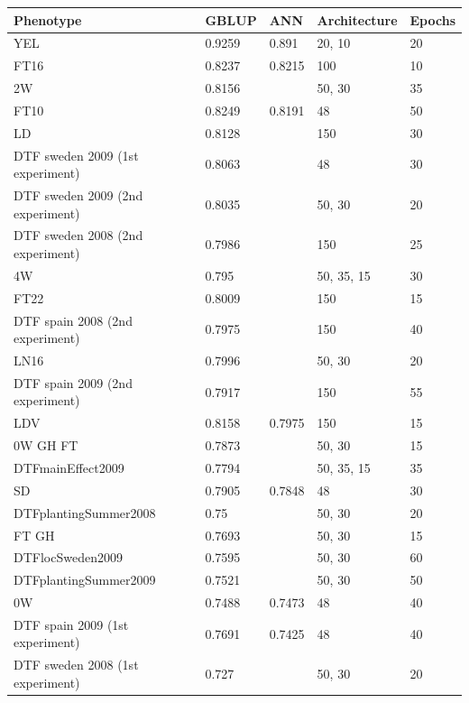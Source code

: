 \begin{longtable}{p{} p{} p{} p{} p{}}
  \hline
  Phenotype & GBLUP & ANN & Architecture & Epochs \\
  \hline
  YEL  & 0.9259 & 0.891 & 20, 10 & 20 \\
  FT16 & 0.8237 & 0.8215 & 100 & 10 \\
  2W & 0.8156 & \color{red}{0.8205} & 50, 30 & 35 \\
  FT10 & 0.8249 & 0.8191 & 48 & 50 \\
  LD & 0.8128 & \color{red}{0.8159} & 150 & 30 \\
  DTF sweden 2009 (1st experiment) & 0.8063 & \color{red}{0.8141} & 48 & 30 \\
  DTF sweden 2009 (2nd experiment) & 0.8035 & \color{red}{0.8091} & 50, 30 & 20 \\
  DTF sweden 2008 (2nd experiment) & 0.7986 & \color{red}{0.8057} & 150 & 25 \\
  4W & 0.795 & \color{red}{0.8052} & 50, 35, 15 & 30 \\
  FT22 & 0.8009 & \color{red}{0.8043} & 150 & 15 \\
  DTF spain 2008 (2nd experiment) & 0.7975 & \color{red}{0.8032} & 150 & 40 \\
  LN16 & 0.7996 & \color{red}{0.7999} & 50, 30 & 20 \\
  DTF spain 2009 (2nd experiment) & 0.7917 & \color{red}{0.7988} & 150 & 55 \\
  LDV & 0.8158 & 0.7975 & 150 & 15 \\
  0W GH FT & 0.7873 & \color{red}{0.7942} & 50, 30 & 15 \\
  DTFmainEffect2009 & 0.7794 & \color{red}{0.7855} & 50, 35, 15 & 35 \\
  SD & 0.7905 & 0.7848 & 48 & 30 \\
  DTFplantingSummer2008 & 0.75 & \color{red}{0.7746} & 50, 30 & 20 \\
  FT GH & 0.7693 & \color{red}{0.7702} & 50, 30 & 15 \\
  DTFlocSweden2009 & 0.7595 & \color{red}{0.7626} & 50, 30 & 60 \\
  DTFplantingSummer2009 & 0.7521 & \color{red}{0.7584} & 50, 30 & 50 \\
  0W & 0.7488 & 0.7473 & 48 & 40 \\
  DTF spain 2009 (1st experiment) & 0.7691 & 0.7425 & 48 & 40 \\
  DTF sweden 2008 (1st experiment) & 0.727 & \color{red}{0.728} & 50, 30 & 20 \\

\end{longtable}
